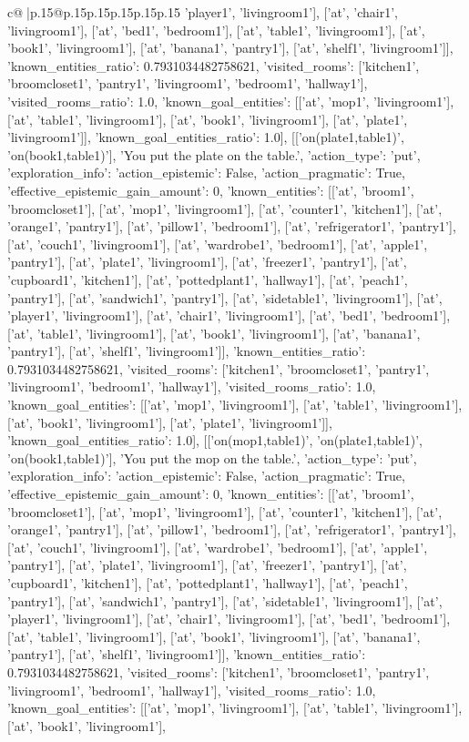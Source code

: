 \documentclass{article}
\begin{document}
{\begin{supertabular}{c@{$\;$}|p{.15\linewidth}@{}p{.15\linewidth}p{.15\linewidth}p{.15\linewidth}p{.15\linewidth}p{.15\linewidth}}
{{{'player1', 'livingroom1'], ['at', 'chair1', 'livingroom1'], ['at', 'bed1', 'bedroom1'], ['at', 'table1', 'livingroom1'], ['at', 'book1', 'livingroom1'], ['at', 'banana1', 'pantry1'], ['at', 'shelf1', 'livingroom1']], 'known_entities_ratio': 0.7931034482758621, 'visited_rooms': ['kitchen1', 'broomcloset1', 'pantry1', 'livingroom1', 'bedroom1', 'hallway1'], 'visited_rooms_ratio': 1.0, 'known_goal_entities': [['at', 'mop1', 'livingroom1'], ['at', 'table1', 'livingroom1'], ['at', 'book1', 'livingroom1'], ['at', 'plate1', 'livingroom1']], 'known_goal_entities_ratio': 1.0}}], [['on(plate1,table1)', 'on(book1,table1)'], 'You put the plate on the table.\n', {'action_type': 'put', 'exploration_info': {'action_epistemic': False, 'action_pragmatic': True, 'effective_epistemic_gain_amount': 0, 'known_entities': [['at', 'broom1', 'broomcloset1'], ['at', 'mop1', 'livingroom1'], ['at', 'counter1', 'kitchen1'], ['at', 'orange1', 'pantry1'], ['at', 'pillow1', 'bedroom1'], ['at', 'refrigerator1', 'pantry1'], ['at', 'couch1', 'livingroom1'], ['at', 'wardrobe1', 'bedroom1'], ['at', 'apple1', 'pantry1'], ['at', 'plate1', 'livingroom1'], ['at', 'freezer1', 'pantry1'], ['at', 'cupboard1', 'kitchen1'], ['at', 'pottedplant1', 'hallway1'], ['at', 'peach1', 'pantry1'], ['at', 'sandwich1', 'pantry1'], ['at', 'sidetable1', 'livingroom1'], ['at', 'player1', 'livingroom1'], ['at', 'chair1', 'livingroom1'], ['at', 'bed1', 'bedroom1'], ['at', 'table1', 'livingroom1'], ['at', 'book1', 'livingroom1'], ['at', 'banana1', 'pantry1'], ['at', 'shelf1', 'livingroom1']], 'known_entities_ratio': 0.7931034482758621, 'visited_rooms': ['kitchen1', 'broomcloset1', 'pantry1', 'livingroom1', 'bedroom1', 'hallway1'], 'visited_rooms_ratio': 1.0, 'known_goal_entities': [['at', 'mop1', 'livingroom1'], ['at', 'table1', 'livingroom1'], ['at', 'book1', 'livingroom1'], ['at', 'plate1', 'livingroom1']], 'known_goal_entities_ratio': 1.0}}], [['on(mop1,table1)', 'on(plate1,table1)', 'on(book1,table1)'], 'You put the mop on the table.\n', {'action_type': 'put', 'exploration_info': {'action_epistemic': False, 'action_pragmatic': True, 'effective_epistemic_gain_amount': 0, 'known_entities': [['at', 'broom1', 'broomcloset1'], ['at', 'mop1', 'livingroom1'], ['at', 'counter1', 'kitchen1'], ['at', 'orange1', 'pantry1'], ['at', 'pillow1', 'bedroom1'], ['at', 'refrigerator1', 'pantry1'], ['at', 'couch1', 'livingroom1'], ['at', 'wardrobe1', 'bedroom1'], ['at', 'apple1', 'pantry1'], ['at', 'plate1', 'livingroom1'], ['at', 'freezer1', 'pantry1'], ['at', 'cupboard1', 'kitchen1'], ['at', 'pottedplant1', 'hallway1'], ['at', 'peach1', 'pantry1'], ['at', 'sandwich1', 'pantry1'], ['at', 'sidetable1', 'livingroom1'], ['at', 'player1', 'livingroom1'], ['at', 'chair1', 'livingroom1'], ['at', 'bed1', 'bedroom1'], ['at', 'table1', 'livingroom1'], ['at', 'book1', 'livingroom1'], ['at', 'banana1', 'pantry1'], ['at', 'shelf1', 'livingroom1']], 'known_entities_ratio': 0.7931034482758621, 'visited_rooms': ['kitchen1', 'broomcloset1', 'pantry1', 'livingroom1', 'bedroom1', 'hallway1'], 'visited_rooms_ratio': 1.0, 'known_goal_entities': [['at', 'mop1', 'livingroom1'], ['at', 'table1', 'livingroom1'], ['at', 'book1', 'livingroom1'], }}}
\end{supertabular}}
\end{document}
